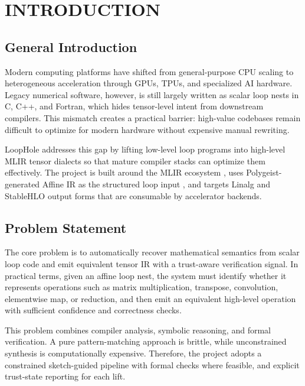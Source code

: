 \chapter{INTRODUCTION}
\section{General Introduction}
Modern computing platforms have shifted from general-purpose CPU scaling to heterogeneous acceleration through GPUs, TPUs, and specialized AI hardware. Legacy numerical software, however, is still largely written as scalar loop nests in C, C++, and Fortran, which hides tensor-level intent from downstream compilers. This mismatch creates a practical barrier: high-value codebases remain difficult to optimize for modern hardware without expensive manual rewriting.

LoopHole addresses this gap by lifting low-level loop programs into high-level MLIR tensor dialects so that mature compiler stacks can optimize them effectively. The project is built around the MLIR ecosystem \cite{mlir}, uses Polygeist-generated Affine IR as the structured loop input \cite{polygeist}, and targets Linalg and StableHLO output forms that are consumable by accelerator backends.

\section{Problem Statement}
The core problem is to automatically recover mathematical semantics from scalar loop code and emit equivalent tensor IR with a trust-aware verification signal. In practical terms, given an affine loop nest, the system must identify whether it represents operations such as matrix multiplication, transpose, convolution, elementwise map, or reduction, and then emit an equivalent high-level operation with sufficient confidence and correctness checks.

This problem combines compiler analysis, symbolic reasoning, and formal verification. A pure pattern-matching approach is brittle, while unconstrained synthesis is computationally expensive. Therefore, the project adopts a constrained sketch-guided pipeline with formal checks where feasible, and explicit trust-state reporting for each lift.

